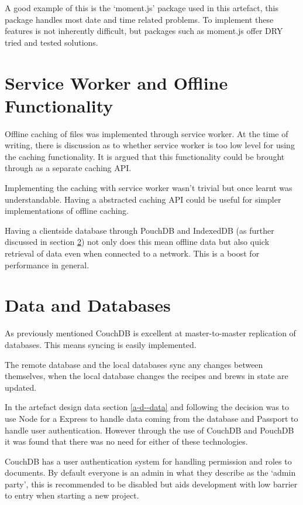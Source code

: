 A good example of this is the `moment.js' package used in this artefact, this package handles most date and time related problems. To implement these features is not inherently difficult, but packages such as moment.js offer DRY tried and tested solutions. \cite{moment.js}

\section{Service Worker and Offline Functionality} \label{s-i--sw-offline}

Offline caching of files was implemented through service worker. At the time of writing, there is discussion as to whether service worker is too low level for using the caching functionality. It is argued that this functionality could be brought through as a separate caching API. \cite{sw_sledgehammer}

Implementing the caching with service worker wasn't trivial but once learnt was understandable. Having a abstracted caching API could be useful for simpler implementations of offline caching.

Having a clientside database through PouchDB and IndexedDB (as further discussed in section \ref{s-i--data-and-databases}) not only does this mean offline data but also quick retrieval of data even when connected to a network. This is a boost for performance in general.

\section{Data and Databases} \label{s-i--data-and-databases}

As previously mentioned CouchDB is excellent at master-to-master replication of databases. This means syncing is easily implemented.

The remote database and the local databases sync any changes between themselves, when the local database changes the recipes and brews in state are updated.

In the artefact design data section \ref{a-d--data} and following the decision was to use Node for a Express to handle data coming from the database and Passport to handle user authentication. However through the use of CouchDB and PouchDB it was found that there was no need for either of these technologies.

CouchDB has a user authentication system for handling permission and roles to documents. By default everyone is an admin in what they describe as the `admin party', this is recommended to be disabled but aids development with low barrier to entry when starting a new project.

